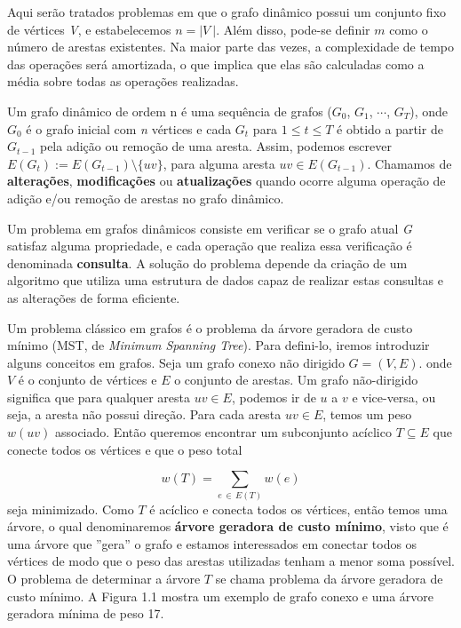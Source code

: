 Aqui serão tratados problemas em que o grafo dinâmico possui um conjunto fixo de vértices \textit{V}, e estabelecemos $n = |\textit{V}\ |$. Além disso, pode-se definir $m$ como o número de arestas existentes. Na maior parte das vezes, a complexidade de tempo das operações será amortizada, o que implica que elas são calculadas como a média sobre todas as operações realizadas. 


Um grafo dinâmico de ordem n é uma sequência de grafos ($G_0$, $G_1$, $\cdots$, $G_T$), onde $G_0$ é o grafo inicial com \textit{n} vértices e cada $G_t$ para $1 \leq t \leq T$ é obtido a partir de $G_{t-1}$ pela adição ou remoção de uma aresta. Assim, podemos escrever $E(G_{t}) := E(G_{t - 1}) \setminus \{uv\}$, para alguma aresta $uv \in E(G_{t-1})$. Chamamos de \textbf{alterações}, \textbf{modificações} ou \textbf{atualizações} quando ocorre alguma operação de adição e/ou remoção de arestas no grafo dinâmico.

Um problema em grafos dinâmicos consiste em verificar se o grafo atual \textit{G} satisfaz alguma propriedade, e cada operação que realiza essa verificação é denominada \textbf{consulta}. A solução do problema depende da criação de um algoritmo que utiliza uma estrutura de dados capaz de realizar estas consultas e as alterações de forma eficiente. 

Um problema clássico em grafos é o problema da árvore geradora de custo mínimo (MST, de \textit{Minimum Spanning Tree}). Para defini-lo, iremos introduzir alguns conceitos em grafos. Seja um grafo conexo não dirigido $G = (V, E)$. onde $V$ é o conjunto de vértices e $E$ o conjunto de arestas. Um grafo não-dirigido significa que para qualquer aresta $uv \in E$, podemos ir de $u$ a $v$ e vice-versa, ou seja, a aresta não possui direção. Para cada aresta $uv \in E$, temos um peso $w(uv)$ associado. Então queremos encontrar um subconjunto acíclico $T \subseteq E$ que conecte todos os vértices e que o peso total 

$$
w(T) = \sum_{e \,\in\, E(T)} w(e)
$$
seja minimizado. Como $T$ é acíclico e conecta todos os vértices, então temos uma árvore, o qual denominaremos \textbf{árvore geradora de custo mínimo}, visto que é uma árvore que ''gera'' o grafo e estamos interessados em conectar todos os vértices de modo que o peso das arestas utilizadas tenham a menor soma possível. O problema de determinar a árvore $T$ se chama problema da árvore geradora de custo mínimo. A Figura 1.1 mostra um exemplo de grafo conexo e uma árvore geradora mínima de peso 17.

